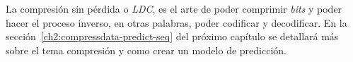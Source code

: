 La compresión sin pérdida o \emph{LDC}, es el arte de poder comprimir \emph{bits} y poder hacer el proceso inverso, en otras palabras,  poder codificar y decodificar. En la  sección~\ref{ch2:compressdata-predict-seq} del próximo capítulo 
se detallará más sobre el tema compresión y como  crear un modelo de predicción.
